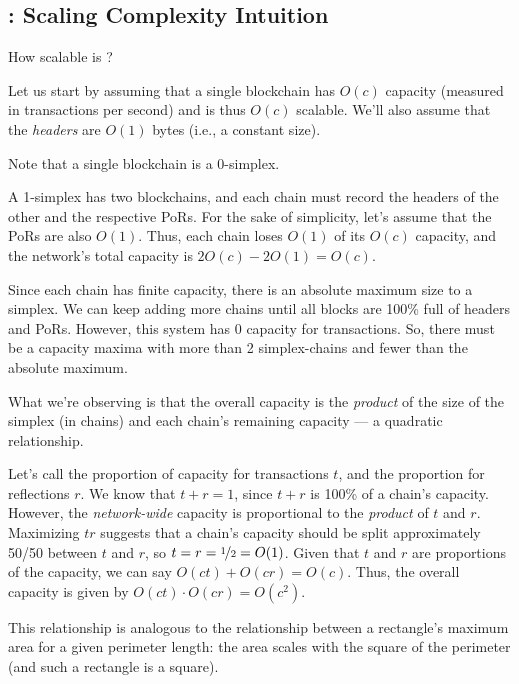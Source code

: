 \subsection{: Scaling Complexity Intuition}


How scalable is ?

Let us start by assuming that a single blockchain has $O(c)$ capacity (measured in transactions per second) and is thus $O(c)$ scalable.
We'll also assume that the \emph{headers} are $O(1)$ bytes (i.e., a constant size).

Note that a single blockchain is a 0-simplex.

A 1-simplex has two blockchains, and each chain must record the headers of the other and the respective PoRs.
For the sake of simplicity, let's assume that the PoRs are also $O(1)$.
Thus, each chain loses $O(1)$ of its $O(c)$ capacity, and the network's total capacity is $2O(c)-2O(1) = O(c)$.

Since each chain has finite capacity, there is an absolute maximum size to a simplex.
We can keep adding more chains until all blocks are 100\% full of headers and PoRs.
However, this system has 0 capacity for transactions.
So, there must be a capacity maxima with more than 2 simplex-chains and fewer than the absolute maximum.

What we're observing is that the overall capacity is the \emph{product} of the size of the simplex (in chains) and each chain's remaining capacity --- a quadratic relationship.

Let's call the proportion of capacity for transactions $t$, and the proportion for reflections $r$.
We know that $t + r = 1$, since $t+r$ is 100\% of a chain's capacity.
However, the \emph{network-wide} capacity is proportional to the \emph{product} of $t$ and $r$.
Maximizing $t r$ suggests that a chain's capacity should be split approximately 50/50 between $t$ and $r$, so $t=r=\nicefrac{1}{2}=O(1)$.
Given that $t$ and $r$ are proportions of the capacity, we can say $O(ct) + O(cr) = O(c)$.
Thus, the overall capacity is given by $O(ct) \cdot O(cr) = O(c^2)$.

This relationship is analogous to the relationship between a rectangle's maximum area for a given perimeter length: the area scales with the square of the perimeter (and such a rectangle is a square).

